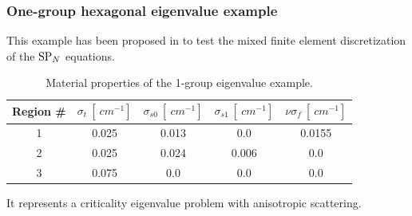  
\subsubsection{One-group hexagonal eigenvalue example}
This example has been proposed in \cite{hebert} to test the mixed finite element discretization of the $\text{SP}_{N}$ equations.
\begin{table}[!ht]
\centering
\begin{tabular}{c|cccc}
Region \# & $\sigma_t\ [\SI{}{cm^{-1}}]$ & $\sigma_{s0}\ [\SI{}{cm^{-1}}]$ & $\sigma_{s1}\ [\SI{}{cm^{-1}}]$ &
$\nu \sigma_{f}\ [\SI{}{cm^{-1}}]$ \\\hline 
		1   & 0.025 & 0.013 & 0.0   & 0.0155\\[.2em] 
		2   & 0.025 & 0.024 & 0.006 & 0.0 \\[.2em] 
		3   & 0.075 & 0.0 & 0.0     & 0.0
\end{tabular}
\caption[Material properties of the 1-group eigenvalue example]{Material properties of the 1-group eigenvalue example.}
\label{tab:prop5}
\end{table}
It represents a criticality eigenvalue problem with anisotropic scattering.


